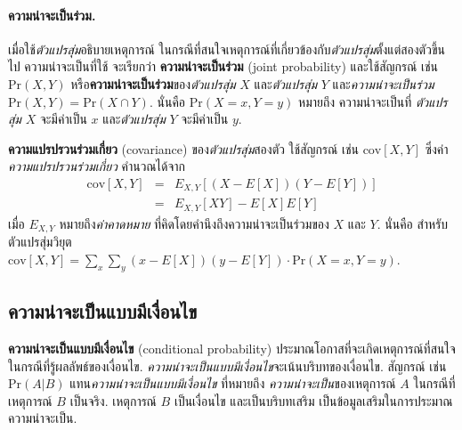 \paragraph{ความน่าจะเป็นร่วม.}
เมื่อใช้\textit{ตัวแปรสุ่ม}อธิบายเหตุการณ์
ในกรณีที่สนใจเหตุการณ์ที่เกี่ยวข้องกับ\textit{ตัวแปรสุ่ม}ตั้งแต่สองตัวขึ้นไป 
ความน่าจะเป็นที่ใช้ จะเรียกว่า
\textbf{ความน่าจะเป็นร่วม} (joint probability)
และใช้สัญกรณ์ 
เช่น $\mathrm{Pr}(X, Y)$ หรือ\textbf{ความน่าจะเป็นร่วม}ของ\textit{ตัวแปรสุ่ม} $X$ และ\textit{ตัวแปรสุ่ม} $Y$
และ\textit{ความน่าจะเป็นร่วม}
$\mathrm{Pr}(X, Y) = \mathrm{Pr}(X \cap Y)$.
นั่นคือ
$\mathrm{Pr}(X = x, Y = y)$
หมายถึง
ความน่าจะเป็นที่
\textit{ตัวแปรสุ่ม} $X$ จะมีค่าเป็น $x$
และ\textit{ตัวแปรสุ่ม} $Y$ จะมีค่าเป็น $y$.

\textbf{ความแปรปรวนร่วมเกี่ยว} (covariance)
ของ\textit{ตัวแปรสุ่ม}สองตัว
ใช้สัญกรณ์ เช่น
$\mathrm{cov}[X, Y]$
ซึ่งค่า\textit{ความแปรปรวนร่วมเกี่ยว} คำนวณได้จาก
\begin{eqnarray}
\mathrm{cov}[X, Y] &=& 
E_{X,Y}[(X - E[X])(Y - E[Y])]
\nonumber \\
&=& E_{X,Y}[XY] - E[X]E[Y]
\label{eq: prob covariance}
\end{eqnarray}
เมื่อ $E_{X,Y}$ หมายถึง\textit{ค่าคาดหมาย} ที่คิดโดยคำนึงถึงความน่าจะเป็นร่วมของ $X$ และ $Y$.
นั่นคือ
สำหรับตัวแปรสุ่มวิยุต
$ 
\mathrm{cov}[X, Y] =
\sum_x \sum_y (x - E[X])(y - E[Y]) \cdot \mathrm{Pr}(X=x, Y=y)$.


\subsection{ความน่าจะเป็นแบบมีเงื่อนไข} 
\label{sec: cond prob}

\textbf{ความน่าจะเป็นแบบมีเงื่อนไข} (conditional probability) 
ประมาณโอกาสที่จะเกิดเหตุการณ์ที่สนใจ ในกรณีที่รู้ผลลัพธ์ของเงื่อนไข.
\textit{ความน่าจะเป็นแบบมีเงื่อนไข}จะเน้นบริบทของเงื่อนไข.
สัญกรณ์ เช่น $\mathrm{Pr}(A|B)$ 
แทน\textit{ความน่าจะเป็นแบบมีเงื่อนไข} 
ที่หมายถึง \textit{ความน่าจะเป็น}ของเหตุการณ์ $A$
ในกรณีที่เหตุการณ์ $B$ เป็นจริง.
เหตุการณ์ $B$ เป็นเงื่อนไข
และเป็นบริบทเสริม เป็นข้อมูลเสริมในการประมาณความน่าจะเป็น.

